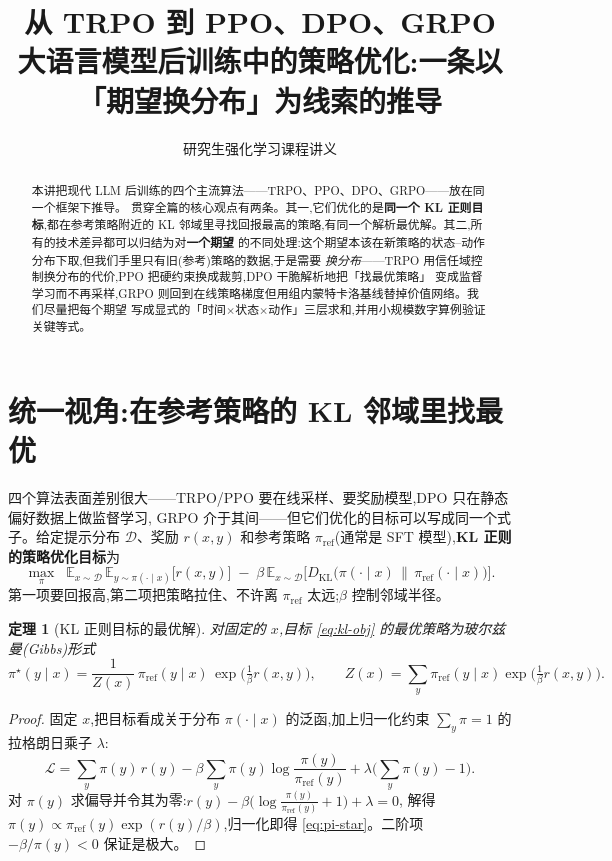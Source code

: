 \documentclass[11pt]{article}
\title{\textbf{从 TRPO 到 PPO、DPO、GRPO}\\[4pt]
\large 大语言模型后训练中的策略优化:一条以「期望换分布」为线索的推导}
\author{研究生强化学习课程讲义}
\date{}
\newcommand{\E}{\mathbb{E}}
\newcommand{\KL}{D_{\mathrm{KL}}}
\newcommand{\piref}{\pi_{\mathrm{ref}}}
\theoremstyle{plain}
\newtheorem{theorem}{定理}[section]
\theoremstyle{definition}
\theoremstyle{remark}
\begin{document}
\maketitle

\begin{abstract}
\noindent
本讲把现代 LLM 后训练的四个主流算法——TRPO、PPO、DPO、GRPO——放在同一个框架下推导。
贯穿全篇的核心观点有两条。其一,它们优化的是\textbf{同一个 KL 正则目标},都在参考策略附近的
KL 邻域里寻找回报最高的策略,有同一个解析最优解。其二,所有的技术差异都可以归结为对\textbf{一个期望}
的不同处理:这个期望本该在新策略的状态--动作分布下取,但我们手里只有旧(参考)策略的数据,于是需要
\emph{换分布}——TRPO 用信任域控制换分布的代价,PPO 把硬约束换成裁剪,DPO 干脆解析地把「找最优策略」
变成监督学习而不再采样,GRPO 则回到在线策略梯度但用组内蒙特卡洛基线替掉价值网络。我们尽量把每个期望
写成显式的「时间$\times$状态$\times$动作」三层求和,并用小规模数字算例验证关键等式。
\end{abstract}

\tableofcontents
\bigskip

\section{统一视角:在参考策略的 KL 邻域里找最优}

四个算法表面差别很大——TRPO/PPO 要在线采样、要奖励模型,DPO 只在静态偏好数据上做监督学习,
GRPO 介于其间——但它们优化的目标可以写成同一个式子。给定提示分布 $\mathcal{D}$、奖励 $r(x,y)$
和参考策略 $\piref$(通常是 SFT 模型),\textbf{KL 正则的策略优化目标}为
\begin{equation}\label{eq:kl-obj}
\max_{\pi}\;\; \E_{x\sim\mathcal{D}}\,\E_{y\sim\pi(\cdot\mid x)}\big[r(x,y)\big]
\;-\;\beta\,\E_{x\sim\mathcal{D}}\big[\KL\big(\pi(\cdot\mid x)\,\|\,\piref(\cdot\mid x)\big)\big].
\end{equation}
第一项要回报高,第二项把策略拉住、不许离 $\piref$ 太远;$\beta$ 控制邻域半径。

\begin{theorem}[KL 正则目标的最优解]\label{thm:gibbs}
对固定的 $x$,目标 \eqref{eq:kl-obj} 的最优策略为玻尔兹曼(Gibbs)形式
\begin{equation}\label{eq:pi-star}
\pi^\star(y\mid x)=\frac{1}{Z(x)}\,\piref(y\mid x)\,\exp\!\Big(\tfrac{1}{\beta}r(x,y)\Big),
\qquad Z(x)=\sum_{y}\piref(y\mid x)\exp\!\Big(\tfrac{1}{\beta}r(x,y)\Big).
\end{equation}
\end{theorem}
\begin{proof}
固定 $x$,把目标看成关于分布 $\pi(\cdot\mid x)$ 的泛函,加上归一化约束 $\sum_y\pi=1$ 的拉格朗日乘子 $\lambda$:
\[
\mathcal{L}=\sum_y \pi(y)\,r(y)-\beta\sum_y\pi(y)\log\frac{\pi(y)}{\piref(y)}+\lambda\Big(\sum_y\pi(y)-1\Big).
\]
对 $\pi(y)$ 求偏导并令其为零:$r(y)-\beta\big(\log\frac{\pi(y)}{\piref(y)}+1\big)+\lambda=0$,
解得 $\pi(y)\propto \piref(y)\exp(r(y)/\beta)$,归一化即得 \eqref{eq:pi-star}。二阶项 $-\beta/\pi(y)<0$ 保证是极大。
\end{proof}
\end{document}
